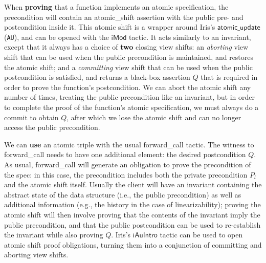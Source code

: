 \documentclass[11pt]{article}
\begin{document}
When \textbf{proving} that a function implements an atomic specification, the precondition will contain an \textsf{atomic\_shift} assertion with the public pre- and postcondition inside it. This atomic shift is a wrapper around Iris's $\mathsf{atomic\_update}$ (\texttt{AU}), and can be opened with the $\mathsf{iMod}$ tactic. It acts similarly to an invariant, except that it always has a choice of \textbf{two} closing view shifts: an \emph{aborting} view shift that can be used when the public precondition is maintained, and restores the atomic shift; and a \emph{committing} view shift that can be used when the public postcondition is satisfied, and returns a black-box assertion $Q$ that is required in order to prove the function's postcondition. We can abort the atomic shift any number of times, treating the public precondition like an invariant, but in order to complete the proof of the function's atomic specification, we must always do a commit to obtain $Q$, after which we lose the atomic shift and can no longer access the public precondition.

We can \textbf{use} an atomic triple with the usual \textsf{forward\_call} tactic. The witness to \textsf{forward\_call} needs to have one additional element: the desired postcondition $Q$. As usual, \textsf{forward\_call} will generate an obligation to prove the precondition of the spec: in this case, the precondition includes both the private precondition $P_l$ and the atomic shift itself. Usually the client will have an invariant containing the abstract state of the data structure (i.e., the public precondition) as well as additional information (e.g., the history in the case of linearizability); proving the atomic shift will then involve proving that the contents of the invariant imply the public precondition, and that the public postcondition can be used to re-establish the invariant while also proving $Q$. Iris's $\mathsf{iAuIntro}$ tactic can be used to open atomic shift proof obligations, turning them into a conjunction of committing and aborting view shifts.
\end{document}
